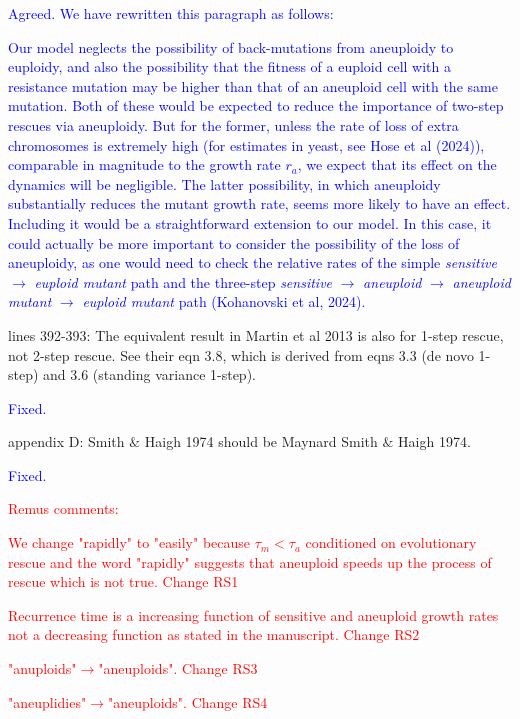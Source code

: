 \documentclass[12pt]{extarticle}
\begin{document}
\textcolor{blue}{Agreed. We have rewritten this paragraph as follows:
\begin{displayquote}
    Our model neglects the possibility of back-mutations from aneuploidy to euploidy, and also the possibility that the fitness of a euploid cell with a resistance mutation may be higher than that of an aneuploid cell with the same mutation. 
    Both of these would be expected to reduce the importance of two-step rescues via aneuploidy.
    But for the former, unless the rate of loss of extra chromosomes is extremely high (for estimates in yeast, see Hose et al (2024)), comparable in magnitude to the growth rate $r_a$, we expect that its effect on the dynamics will be negligible.
    The latter possibility, in which aneuploidy substantially reduces the mutant growth rate, seems more likely
    to have an effect. 
    Including it would be a straightforward extension to our model.
    In this case, it could actually be more important to consider the possibility of the loss of aneuploidy, 
    as one would need to check the relative rates of the simple \textit{sensitive} $\rightarrow$ \textit{euploid mutant} path and the three-step \textit{sensitive} $\rightarrow$ \textit{aneuploid} $\rightarrow$ \textit{aneuploid mutant} $\rightarrow$ \textit{euploid mutant} path (Kohanovski et al, 2024).
\end{displayquote}
}

lines 392-393: The equivalent result in Martin et al 2013 is also for 1-step rescue, not 2-step rescue. See their eqn 3.8, which is derived from eqns 3.3 (de novo 1-step) and 3.6 (standing variance 1-step).

\textcolor{blue}{Fixed.}

appendix D: Smith $\&$ Haigh 1974 should be Maynard Smith $\&$ Haigh 1974.

\textcolor{blue}{Fixed.}

\textcolor{red}{Remus comments:}

\textcolor{red}{We change "rapidly" to "easily" because $\tau_m<\tau_a$ conditioned on evolutionary rescue and the word "rapidly" suggests that aneuploid speeds up the process of rescue which is not true. Change RS1}

\textcolor{red}{Recurrence time is a increasing function of sensitive and aneuploid growth rates not a decreasing function as stated in the manuscript. Change RS2}

\textcolor{red}{"anuploids"$\rightarrow$"aneuploids". Change RS3}

\textcolor{red}{"aneuplidies"$\rightarrow$"aneuploids". Change RS4}








\end{document}
